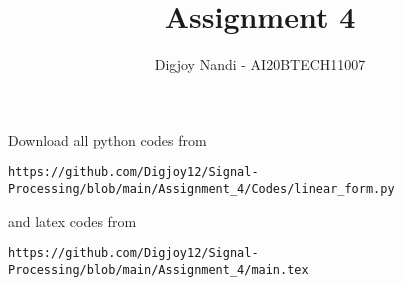 \documentclass[journal,12pt,twocolumn]{IEEEtran}
\DeclareMathOperator*{\Res}{Res}
\begin{document}
\newcommand{\BEQA}{\begin{eqnarray}}
\newcommand{\EEQA}{\end{eqnarray}}
\newcommand{\define}{\stackrel{\triangle}{=}}

\raggedbottom
\setlength{\parindent}{0pt}
\providecommand{\mbf}{\mathbf}
\providecommand{\pr}[1]{\ensuremath{\Pr\left(#1\right)}}
\providecommand{\qfunc}[1]{\ensuremath{Q\left(#1\right)}}
\providecommand{\sbrak}[1]{\ensuremath{{}\left[#1\right]}}
\providecommand{\lsbrak}[1]{\ensuremath{{}\left[#1\right.}}
\providecommand{\rsbrak}[1]{\ensuremath{{}\left.#1\right]}}
\providecommand{\brak}[1]{\ensuremath{\left(#1\right)}}
\providecommand{\lbrak}[1]{\ensuremath{\left(#1\right.}}
\providecommand{\rbrak}[1]{\ensuremath{\left.#1\right)}}
\providecommand{\cbrak}[1]{\ensuremath{\left\{#1\right\}}}
\providecommand{\lcbrak}[1]{\ensuremath{\left\{#1\right.}}
\providecommand{\rcbrak}[1]{\ensuremath{\left.#1\right\}}}
\theoremstyle{remark}
\newtheorem{rem}{Remark}
\newcommand{\sgn}{\mathop{\mathrm{sgn}}}
\providecommand{\abs}[1]{\vert#1\vert}
\providecommand{\res}[1]{\Res\displaylimits_{#1}} 
\providecommand{\norm}[1]{\lVert#1\rVert}
\providecommand{\mtx}[1]{\mathbf{#1}}
\providecommand{\mean}[1]{E[ #1 ]}
\providecommand{\fourier}{\overset{\mathcal{F}}{ \rightleftharpoons}}
\providecommand{\system}{\overset{\mathcal{H}}{ \longleftrightarrow}}
\newcommand{\solution}{\noindent \textbf{Solution: }}
\newcommand{\cosec}{\,\text{cosec}\,}
\providecommand{\dec}[2]{\ensuremath{\overset{#1}{\underset{#2}{\gtrless}}}}
\newcommand{\myvec}[1]{\ensuremath{\begin{pmatrix}#1\end{pmatrix}}}
\newcommand{\mydet}[1]{\ensuremath{\begin{vmatrix}#1\end{vmatrix}}}
\makeatletter
{}
\makeatother
\let\StandardTheFigure\thefigure
\let\vec\mathbf
\renewcommand{\thefigure}{\theproblem}
\def\putbox#1#2#3{\makebox[0in][l]{\makebox[#1][l]{}\raisebox{\baselineskip}[0in][0in]{\raisebox{#2}[0in][0in]{#3}}}}
     \def\rightbox#1{\makebox[0in][r]{#1}}
     \def\centbox#1{\makebox[0in]{#1}}
     \def\topbox#1{\raisebox{-\baselineskip}[0in][0in]{#1}}
     \def\midbox#1{\raisebox{-0.5\baselineskip}[0in][0in]{#1}}
\vspace{3cm}
\title{Assignment 4}
\author{Digjoy Nandi - AI20BTECH11007}
\maketitle
\newpage
\bigskip
\renewcommand{\thefigure}{\theenumi}
\renewcommand{\thetable}{\theenumi}
Download all python codes from 
\begin{lstlisting}
https://github.com/Digjoy12/Signal-Processing/blob/main/Assignment_4/Codes/linear_form.py
\end{lstlisting}
%
and latex codes from 
%
\begin{lstlisting}
https://github.com/Digjoy12/Signal-Processing/blob/main/Assignment_4/main.tex
\end{lstlisting}
\end{document}
